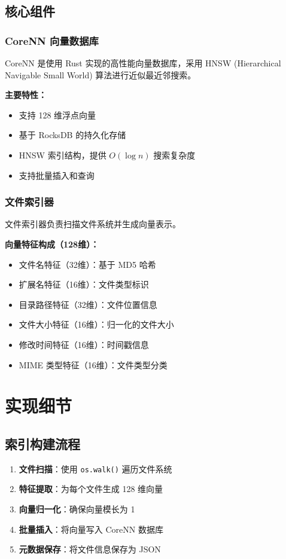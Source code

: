 \documentclass[12pt,a4paper]{article}
\begin{document}
\subsection{核心组件}

\subsubsection{CoreNN 向量数据库}
CoreNN 是使用 Rust 实现的高性能向量数据库，采用 HNSW (Hierarchical Navigable Small World) 算法进行近似最近邻搜索。

\textbf{主要特性：}
\begin{itemize}
    \item 支持 128 维浮点向量
    \item 基于 RocksDB 的持久化存储
    \item HNSW 索引结构，提供 $O(\log n)$ 搜索复杂度
    \item 支持批量插入和查询
\end{itemize}

\subsubsection{文件索引器}
文件索引器负责扫描文件系统并生成向量表示。

\textbf{向量特征构成（128维）：}
\begin{itemize}
    \item 文件名特征（32维）：基于 MD5 哈希
    \item 扩展名特征（16维）：文件类型标识
    \item 目录路径特征（32维）：文件位置信息
    \item 文件大小特征（16维）：归一化的文件大小
    \item 修改时间特征（16维）：时间戳信息
    \item MIME 类型特征（16维）：文件类型分类
\end{itemize}

\section{实现细节}

\subsection{索引构建流程}

\begin{enumerate}
    \item \textbf{文件扫描}：使用 \texttt{os.walk()} 遍历文件系统
    \item \textbf{特征提取}：为每个文件生成 128 维向量
    \item \textbf{向量归一化}：确保向量模长为 1
    \item \textbf{批量插入}：将向量写入 CoreNN 数据库
    \item \textbf{元数据保存}：将文件信息保存为 JSON
\end{enumerate}
\end{document}
